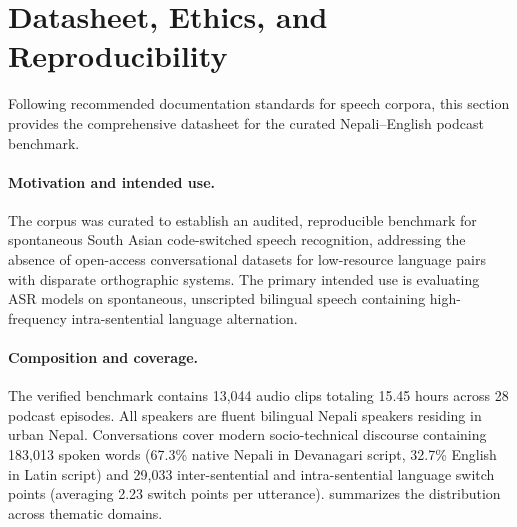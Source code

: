 \documentclass[10pt,twocolumn,a4paper]{article}
\begin{document}
\clearpage

\section{Datasheet, Ethics, and Reproducibility}
\label{sec:app_datasheet}

Following recommended documentation standards for speech corpora, this section provides the comprehensive datasheet for the curated Nepali--English podcast benchmark.

\paragraph{Motivation and intended use.}
The corpus was curated to establish an audited, reproducible benchmark for spontaneous South Asian code-switched speech recognition, addressing the absence of open-access conversational datasets for low-resource language pairs with disparate orthographic systems. The primary intended use is evaluating ASR models on spontaneous, unscripted bilingual speech containing high-frequency intra-sentential language alternation.

\paragraph{Composition and coverage.}
The verified benchmark contains 13,044 audio clips totaling 15.45 hours across 28 podcast episodes. All speakers are fluent bilingual Nepali speakers residing in urban Nepal. Conversations cover modern socio-technical discourse containing 183,013 spoken words (67.3\% native Nepali in Devanagari script, 32.7\% English in Latin script) and 29,033 inter-sentential and intra-sentential language switch points (averaging 2.23 switch points per utterance).  summarizes the distribution across thematic domains.
\end{document}
